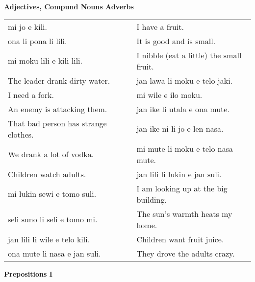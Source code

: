 \textbf{Adjectives, Compund Nouns Adverbs} 
\label{'adjectives_compund_nouns_adverbs'}

\begin{supertabular}{p{5,5cm}|ll}
mi jo e kili.  &&  I have a fruit. \\
ona li pona li lili. && It is good and is small. \\
mi moku lili e kili lili.  && I nibble (eat a little) the small fruit. \\
The leader drank dirty water.  && jan lawa li moku e telo jaki. \\ %
I need a fork.  && mi wile e ilo moku. \\ %
An enemy is attacking them. && jan ike li utala e ona mute. \\ %
That bad person has strange clothes.  && jan ike ni li jo e len nasa. \\ %
We drank a lot of vodka.  && mi mute li moku e telo nasa mute. \\ %
Children watch adults.  && jan lili li lukin e jan suli. \\ %
mi lukin sewi e tomo suli.  && I am looking up at the big building. \\
seli suno li seli e tomo mi.  && The sun's warmth heats my home.  \\
jan lili li wile e telo kili.  && Children want fruit juice. \\
ona mute li nasa e jan suli.  && They drove the adults crazy. \\
\end{supertabular} 

\textbf{Prepositions I} 
\label{'prepositions01'}

